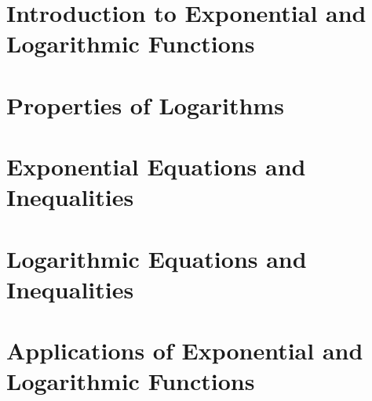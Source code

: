 \section{Introduction to Exponential and Logarithmic Functions}



\newpage

\section{Properties of Logarithms}



\newpage

\section{Exponential Equations and Inequalities}



\newpage

\section{Logarithmic Equations and Inequalities}



\newpage

\section{Applications of Exponential and Logarithmic Functions}



